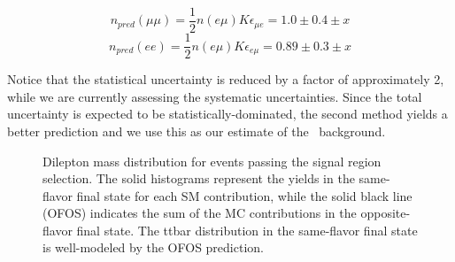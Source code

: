 \begin{equation}
n_{pred}(\mu\mu) = \frac{1}{2}n(e\mu)K\epsilon_{\mu e} = 1.0 \pm 0.4 \pm x
\end{equation}
\begin{equation}
n_{pred}(ee)     = \frac{1}{2}n(e\mu)K\epsilon_{e\mu} = 0.89 \pm 0.3 \pm x
\end{equation}

Notice that the statistical uncertainty is reduced by a factor of approximately 2, while we are currently assessing the systematic uncertainties.
Since the total uncertainty is expected to be statistically-dominated, the second method yields a better prediction and we use this as our estimate
of the \ttbar~background.


\begin{figure}[hbt]
  \begin{center}
    \caption{Dilepton mass distribution for events passing the signal region selection. The solid histograms represent the yields in the same-flavor
      final state for each SM contribution, while the solid black line (OFOS) indicates the sum of the MC contributions in the opposite-flavor final state.
      The ttbar distribution in the same-flavor final state is well-modeled by the OFOS prediction.}
    \label{fig:ttbar}
  \end{center}
\end{figure}
